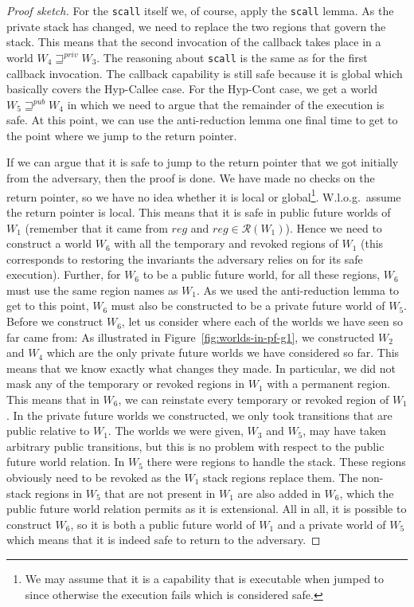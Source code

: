 \documentclass[format=acmsmall, review=true, screen=true]{acmart}
\renewcommand{\figurename}{Figure}
\newcommand{\var}[1]{\mathit{#1}}
\newcommand{\reg}{\var{reg}}
\newcommand{\futurewk}{\mathbin{\sqsupseteq}^{\var{pub}}}
\newcommand{\futurestr}{\mathbin{\sqsupseteq}^{\var{priv}}}
\newcommand{\asmType}{\plaindom{AsmType}}
\newcommand{\plaindom}[1]{\mathrm{#1}}
\newcommand{\intr}[2]{\mathcal{#1}}
\newcommand{\regintr}[1]{\intr{R}{#1}}
\newcommand{\stdrr}{\regintr{\asmType}}
\newenvironment{toplas}%
    {\color{OliveGreen}}{}
\begin{document}
\begin{toplas}
\begin{proof}[Proof sketch]
  For the \texttt{scall} itself we, of course, apply the \texttt{scall} lemma.
  As the private stack has changed, we need to replace the two regions that govern the stack.
  This means that the second invocation of the callback takes place in a world $W_4 \futurestr W_3$.
  The reasoning about \texttt{scall} is the same as for the first callback invocation.
  The callback capability is still safe because it is global which basically covers the Hyp-Callee case.
  For the Hyp-Cont case, we get a world $W_5 \futurewk W_4$ in which we need to argue that the remainder of the execution is safe.
  At this point, we can use the anti-reduction lemma one final time to get to the point where we jump to the return pointer.
  
  If we can argue that it is safe to jump to the return pointer that we got initially from the adversary, then the proof is done.
  We have made no checks on the return pointer, so we have no idea whether it is local or global\footnote{We may assume that it is a capability that is executable when jumped to since otherwise the execution fails which is considered safe.}.
  W.l.o.g.\ assume the return pointer is local.
  This means that it is safe in public future worlds of $W_1$ (remember that it came from $\reg$ and $\reg \in \stdrr(W_1)$).
  Hence we need to construct a world $W_6$ with all the temporary and revoked regions of $W_1$ (this corresponds to restoring the invariants the adversary relies on for its safe execution).
  Further, for $W_6$ to be a public future world, for all these regions, $W_6$ must use the same region names as $W_1$. 
  As we used the anti-reduction lemma to get to this point, $W_6$ must also be constructed to be a private future world of $W_5$.
  Before we construct $W_6$, let us consider where each of the worlds we have seen so far came from: As illustrated in \figurename~\ref{fig:worlds-in-pf-g1}, we constructed $W_2$ and $W_4$ which are the only private future worlds we have considered so far.
  This means that we know exactly what changes they made.
  In particular, we did not mask any of the temporary or revoked regions in $W_1$ with a permanent region.
  This means that in $W_6$, we can reinstate every temporary or revoked region of $W_1$.
  In the private future worlds we constructed, we only took transitions that are
  public relative to $W_1$.
  The worlds we were given, $W_3$ and $W_5$, may have taken arbitrary public transitions, but this is no problem with respect to the public future world relation.
  In $W_5$ there were regions to handle the stack.
  These regions obviously need to be revoked as the $W_1$ stack regions replace them.
  The non-stack regions in $W_5$ that are not present in $W_1$ are also added in $W_6$, which the public future world relation permits as it is extensional.
  All in all, it is possible to construct $W_6$, so it is both a public future world of $W_1$ and a private world of $W_5$ which means that it is indeed safe to return to the adversary.


\end{proof}
\end{toplas}
\end{document}
